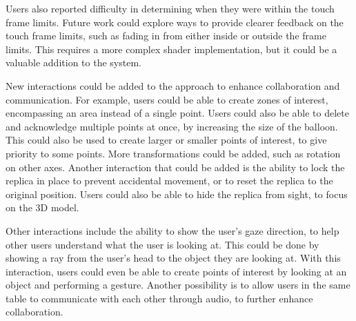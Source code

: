     Users also reported difficulty in determining when they were within the touch frame limits. Future work could explore ways to provide clearer feedback on the touch frame limits, such as fading in from either inside or outside the frame limits. This requires a more complex shader implementation, but it could be a valuable addition to the system.

    New interactions could be added to the approach to enhance collaboration and communication. For example, users could be able to create zones of interest, encompassing an area instead of a single point. Users could also be able to delete and acknowledge multiple points at once, by increasing the size of the balloon. This could also be used to create larger or smaller points of interest, to give priority to some points. More transformations could be added, such as rotation on other axes. Another interaction that could be added is the ability to lock the replica in place to prevent accidental movement, or to reset the replica to the original position. Users could also be able to hide the replica from sight, to focus on the 3D model. 

    Other interactions include the ability to show the user's gaze direction, to help other users understand what the user is looking at. This could be done by showing a ray from the user's head to the object they are looking at. With this interaction, users could even be able to create points of interest by looking at an object and performing a gesture. Another possibility is to allow users in the same table to communicate with each other through audio, to further enhance collaboration.


